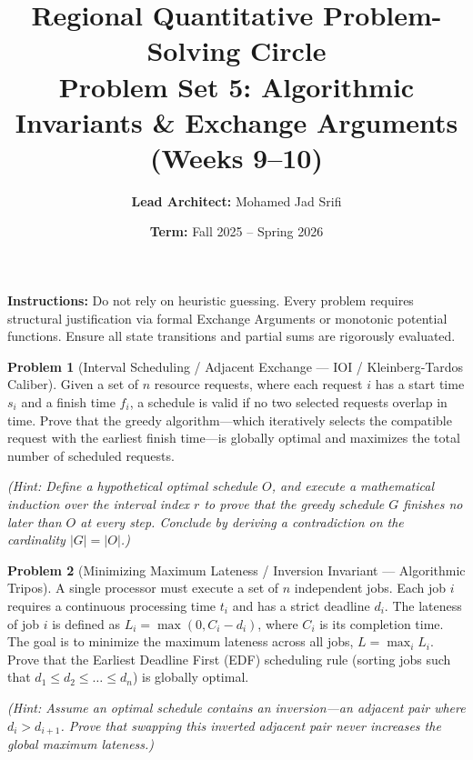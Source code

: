 \documentclass[11pt, a4paper]{article}
\theoremstyle{definition}
\newtheorem{problem}{Problem}
\theoremstyle{plain}
\begin{document}
\title{\vspace{-1.5cm}\textbf{Regional Quantitative Problem-Solving Circle} \\ \Large Problem Set 5: Algorithmic Invariants \& Exchange Arguments (Weeks 9--10)}
\author{\textbf{Lead Architect:} Mohamed Jad Srifi}
\date{\textbf{Term:} Fall 2025 -- Spring 2026}
\maketitle

\noindent\textbf{Instructions:} Do not rely on heuristic guessing. Every problem requires structural justification via formal Exchange Arguments or monotonic potential functions. Ensure all state transitions and partial sums are rigorously evaluated.

\vspace{0.5cm}

\begin{problem}[Interval Scheduling / Adjacent Exchange --- IOI / Kleinberg-Tardos Caliber]
Given a set of $n$ resource requests, where each request $i$ has a start time $s_i$ and a finish time $f_i$, a schedule is valid if no two selected requests overlap in time. 
Prove that the greedy algorithm---which iteratively selects the compatible request with the earliest finish time---is globally optimal and maximizes the total number of scheduled requests.

\textit{(Hint: Define a hypothetical optimal schedule $O$, and execute a mathematical induction over the interval index $r$ to prove that the greedy schedule $G$ finishes no later than $O$ at every step. Conclude by deriving a contradiction on the cardinality $|G| = |O|$.)}
\end{problem}

\vspace{0.5cm}

\begin{problem}[Minimizing Maximum Lateness / Inversion Invariant --- Algorithmic Tripos]
A single processor must execute a set of $n$ independent jobs. Each job $i$ requires a continuous processing time $t_i$ and has a strict deadline $d_i$. The lateness of job $i$ is defined as $L_i = \max(0, C_i - d_i)$, where $C_i$ is its completion time. The goal is to minimize the maximum lateness across all jobs, $L = \max_i L_i$.
Prove that the Earliest Deadline First (EDF) scheduling rule (sorting jobs such that $d_1 \le d_2 \le \dots \le d_n$) is globally optimal.

\textit{(Hint: Assume an optimal schedule contains an inversion---an adjacent pair where $d_i > d_{i+1}$. Prove that swapping this inverted adjacent pair never increases the global maximum lateness.)}
\end{problem}
\end{document}
